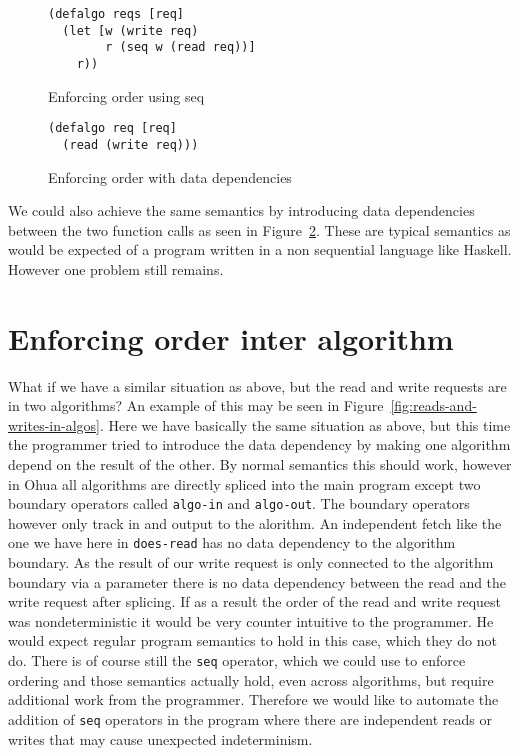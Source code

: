 \begin{figure}
\begin{verbatim}
(defalgo reqs [req]
  (let [w (write req)
        r (seq w (read req))]
    r))
\end{verbatim}
\caption{Enforcing order using seq}
\label{fig:enforcing-order-with-seq}
\end{figure}

\begin{figure}
\begin{verbatim}
(defalgo req [req]
  (read (write req)))
\end{verbatim}
\caption{Enforcing order with data dependencies}
\label{fig:enforcing-order-with-dd}
\end{figure}

We could also achieve the same semantics by introducing data dependencies between the two function calls as seen in Figure~\ref{fig:enforcing-order-with-dd}.
These are typical semantics as would be expected of a program written in a non sequential language like Haskell.
However one problem still remains.

\section{Enforcing order inter algorithm}

What if we have a similar situation as above, but the read and write requests are in two algorithms?
An example of this may be seen in Figure~\ref{fig:reads-and-writes-in-algos}.
Here we have basically the same situation as above, but this time the programmer tried to introduce the data dependency by making one algorithm depend on the result of the other.
By normal semantics this should work, however in Ohua all algorithms are directly spliced into the main program except two boundary operators called \texttt{algo-in} and \texttt{algo-out}.
The boundary operators however only track in and output to the alorithm.
An independent fetch like the one we have here in \texttt{does-read} has no data dependency to the algorithm boundary.
As the result of our write request is only connected to the algorithm boundary via a parameter there is no data dependency between the read and the write request after splicing.
If as a result the order of the read and write request was nondeterministic it would be very counter intuitive to the programmer.
He would expect regular program semantics to hold in this case, which they do not do.
There is of course still the \texttt{seq} operator, which we could use to enforce ordering and those semantics actually hold, even across algorithms, but require additional work from the programmer.
Therefore we would like to automate the addition of \texttt{seq} operators in the program where there are independent reads or writes that may cause unexpected indeterminism.

